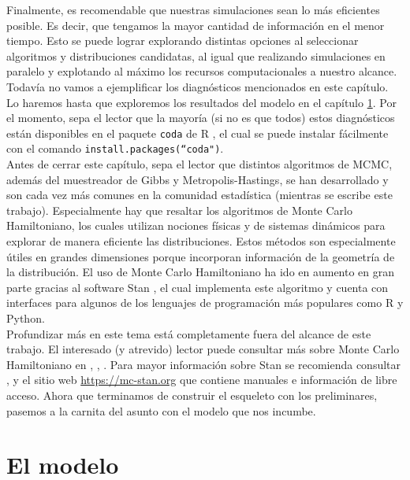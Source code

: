 \documentclass[11pt,a4paper]{article}
\begin{document}
Finalmente, es recomendable que nuestras simulaciones sean lo más eficientes posible. Es decir, que tengamos la mayor cantidad de información en el menor tiempo. Esto se puede lograr explorando distintas opciones al seleccionar algoritmos y distribuciones candidatas, al igual que realizando simulaciones en paralelo y explotando al máximo los recursos computacionales a nuestro alcance.\\

Todavía no vamos a ejemplificar los diagnósticos mencionados en este capítulo. Lo haremos hasta que exploremos los resultados del modelo en el capítulo \ref{elmodelo}. Por el momento, sepa el lector que la mayoría (si no es que todos) estos diagnósticos están disponibles en el paquete \texttt{coda} de R \citep{coda}, el cual se puede instalar fácilmente con el comando \texttt{install.packages(``coda")}.\\

Antes de cerrar este capítulo, sepa el lector que distintos algoritmos de MCMC, además del muestreador de Gibbs y Metropolis-Hastings, se han desarrollado y son cada vez más comunes en la comunidad estadística (mientras se escribe este trabajo). Especialmente hay que resaltar los algoritmos de Monte Carlo Hamiltoniano, los cuales utilizan nociones físicas y de sistemas dinámicos para explorar de manera eficiente las distribuciones. Estos métodos son especialmente útiles en grandes dimensiones porque incorporan información de la geometría de la distribución. El uso de Monte Carlo Hamiltoniano ha ido en aumento en gran parte gracias al software Stan \citep{stan}, el cual implementa este algoritmo y cuenta con interfaces para algunos de los lenguajes de programación más populares como R y Python.\\

Profundizar más en este tema está completamente fuera del alcance de este trabajo. El interesado (y atrevido) lector puede consultar más sobre Monte Carlo Hamiltoniano en \citet{neal}, \citet{betancourt}, \citet{gelman}. Para mayor información sobre Stan se recomienda consultar \citet{gelman}, \citet{kruschke} y el sitio web \url{https://mc-stan.org} que contiene manuales e información de libre acceso. Ahora que terminamos de construir el esqueleto con los preliminares, pasemos a la carnita del asunto con el modelo que nos incumbe.\\

\section{El modelo}
\label{elmodelo}
\end{document}
